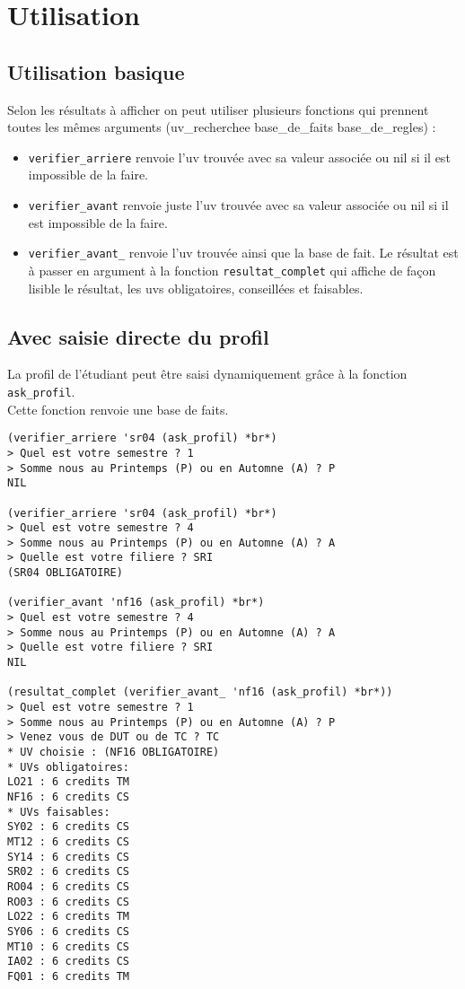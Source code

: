 \documentclass[a4paper, 12pt, final]{article}
\begin{document}
\section{Utilisation}
\label{sec:utilisation}

\subsection{Utilisation basique}
\label{sec:utilisation-basique}

Selon les résultats à afficher on peut utiliser plusieurs fonctions
qui prennent toutes les mêmes arguments (uv\_recherchee base\_de\_faits base\_de\_regles)
:
\begin{itemize}
\item \texttt{verifier\_arriere} renvoie l'uv trouvée avec sa
  valeur associée ou nil si il est impossible de la faire.
\item \texttt{verifier\_avant} renvoie juste l'uv trouvée avec sa
  valeur associée ou nil si il est impossible de la faire.
\item \texttt{verifier\_avant\_} renvoie l'uv trouvée ainsi
  que la base de fait. Le résultat est à passer en argument à la fonction
  \texttt{resultat\_complet} qui affiche de façon lisible le résultat, les
  uvs obligatoires, conseillées et faisables.
\end{itemize}

\subsection{Avec saisie directe du profil}
\label{sec:avec-saisie-directe}

La profil de l'étudiant peut être saisi dynamiquement grâce à la
fonction \texttt{ask\_profil}.\\
Cette fonction renvoie une base de faits.

\begin{verbatim}
(verifier_arriere 'sr04 (ask_profil) *br*)
> Quel est votre semestre ? 1
> Somme nous au Printemps (P) ou en Automne (A) ? P
NIL

(verifier_arriere 'sr04 (ask_profil) *br*)
> Quel est votre semestre ? 4
> Somme nous au Printemps (P) ou en Automne (A) ? A
> Quelle est votre filiere ? SRI
(SR04 OBLIGATOIRE)

(verifier_avant 'nf16 (ask_profil) *br*)
> Quel est votre semestre ? 4
> Somme nous au Printemps (P) ou en Automne (A) ? A
> Quelle est votre filiere ? SRI
NIL

(resultat_complet (verifier_avant_ 'nf16 (ask_profil) *br*))
> Quel est votre semestre ? 1
> Somme nous au Printemps (P) ou en Automne (A) ? P
> Venez vous de DUT ou de TC ? TC
* UV choisie : (NF16 OBLIGATOIRE)
* UVs obligatoires:
LO21 : 6 credits TM
NF16 : 6 credits CS
* UVs faisables:
SY02 : 6 credits CS
MT12 : 6 credits CS
SY14 : 6 credits CS
SR02 : 6 credits CS
RO04 : 6 credits CS
RO03 : 6 credits CS
LO22 : 6 credits TM
SY06 : 6 credits CS
MT10 : 6 credits CS
IA02 : 6 credits CS
FQ01 : 6 credits TM
\end{verbatim}
\end{document}

